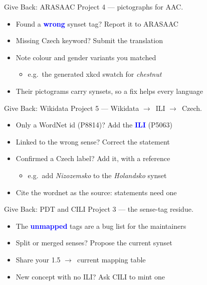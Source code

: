 \documentclass[xetex,aspectratio=169]{beamer}
\newcommand{\txx}[1]{\textbf{\textcolor{blue}{#1}}}
\newcommand{\into}{\ensuremath{\rightarrow}\xspace}
\begin{document}
\begin{frame}{Give Back: ARASAAC}
  Project 4 --- pictographs for AAC.
  \begin{itemize}
  \item Found a \txx{wrong} synset tag? Report it to ARASAAC
  \item Missing Czech keyword? Submit the translation
  \item Note colour and gender variants you matched
    \begin{itemize}
    \item e.g.\ the generated xkcd swatch for \textit{chestnut}
    \end{itemize}
  \item Their pictograms carry synsets, so a fix helps every language
  \end{itemize}
\end{frame}

\begin{frame}{Give Back: Wikidata}
  Project 5 --- Wikidata \into\ ILI \into\ Czech.
  \begin{itemize}
  \item Only a WordNet id (P8814)? Add the \txx{ILI} (P5063)
  \item Linked to the wrong sense? Correct the statement
  \item Confirmed a Czech label? Add it, with a reference
    \begin{itemize}
    \item e.g.\ add \textit{Nizozemsko} to the \textit{Holandsko} synset
    \end{itemize}
  \item Cite the wordnet as the source: statements need one
  \end{itemize}
\end{frame}

\begin{frame}{Give Back: PDT and CILI}
  Project 3 --- the sense-tag residue.
  \begin{itemize}
  \item The \txx{unmapped} tags are a bug list for the maintainers
  \item Split or merged senses? Propose the current synset
  \item Share your 1.5 \into\ current mapping table
  \item New concept with no ILI? Ask CILI to mint one
  \end{itemize}
\end{frame}
\end{document}
